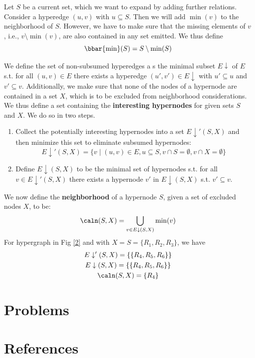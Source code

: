 \documentclass[11pt]{article}
\begin{document}
Let \(S\) be a current set, which we want to expand by adding further relations. Consider a hyperedge
\((u,v)\) with \(u\subseteq S\). Then we will add \(\min(v)\) to the neighborhood of \(S\). However,
we have to make sure that the missing elements of \(v\), i.e., \(v\setminus\min(v)\), are also
contained in any set emitted. We thus define
\begin{equation*}
\bbar{\min}(S)=S\setminus \min(S)
\end{equation*}

We define the set of non-subsumed hyperedges a s the minimal subset \(E\downarrow\) of \(E\) s.t. for
all \((u,v)\in E\) there exists a hyperedge \((u',v')\in E\downarrow\) with \(u'\subseteq u\) and
\(v'\subseteq v\). Additionally, we make sure that none of the nodes of a hypernode are contained in a
set \(X\), which is to be excluded from neighborhood considerations. We thus define a set containing
the \textbf{interesting hypernodes} for given sets \(S\) and \(X\). We do so in two steps.
\begin{enumerate}
\item Collect the potentially interesting hypernodes into a set \(E\downarrow'(S,X)\) and then minimize
this set to eliminate subsumed hypernodes:
\begin{equation*}
E\downarrow'(S,X)=\{v\mid (u,v)\in E,u\subseteq S,v\cap S=\emptyset,v\cap X=\emptyset\}
\end{equation*}
\item Define \(E\downarrow(S,X)\) to be the minimal set of hypernodes s.t. for all
\(v\in E\downarrow'(S,X)\) there exists a hypernode \(v'\) in \(E\downarrow(S,X)\) s.t.
\(v'\subseteq v\).
\end{enumerate}



We now define the \textbf{neighborhood} of a hypernode \(S\), given a set of excluded nodes \(X\), to be:
\begin{equation*}
\caln(S,X)=\bigcup_{v\in E\downarrow(S,X)}\min(v)
\end{equation*}
For hypergraph in Fig \ref{2} and with \(X=S=\{R_1,R_2,R_3\}\), we have
\begin{gather*}
E\downarrow'(S,X)=\{\{R_4,R_5,R_6\}\}\\
E\downarrow(S,X)=\{\{R_4,R_5,R_6\}\}\\
\caln(S,X)=\{R_4\}
\end{gather*}
\section{Problems}
\label{sec:org77342fd}


\section{References}
\label{sec:orgde00f46}
\label{bibliographystyle link}


\label{bibliography link}

\end{document}
